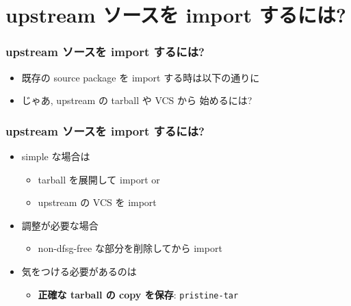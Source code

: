 \documentclass[10pt,final,c,dvipdfmx,cjk,colorlinks=false]{beamer}
\providecommand{\alert}[1]{\textbf{#1}}
\begin{document}
\section{upstream ソースを import するには?}
\label{sec-2}
\begin{frame}
\frametitle{upstream ソースを import するには?}
\label{sec-2-1}


\begin{itemize}
\item 既存の source package を import する時は以下の通りに
\end{itemize}
\begin{itemize}
\item じゃあ, upstream の tarball や VCS から
  始めるには?
\end{itemize}
\end{frame}
\begin{frame}
\frametitle{upstream ソースを import するには?}
\label{sec-2-2}


\begin{itemize}
\item simple な場合は
\begin{itemize}
\item tarball を展開して import \newline
    or
\item upstream の VCS を import
\end{itemize}
\item 調整が必要な場合
\begin{itemize}
\item non-dfsg-free な部分を削除してから import
\end{itemize}
\item 気をつける必要があるのは
\begin{itemize}
\item \alert{\textbf{正確な tarball の copy を保存}}: \texttt{pristine-tar}
\end{itemize}
\end{itemize}
\end{frame}
\end{document}
